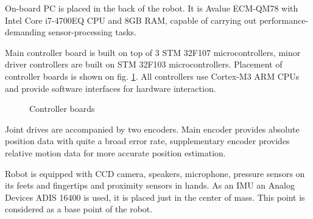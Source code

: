 \documentclass[letterpaper, 10 pt, conference]{ieeeconf}  %
\begin{document}
On-board PC is placed in the back of the robot. It is Avalue ECM-QM78 with Intel
Core i7-4700EQ CPU and 8GB RAM, capable of carrying out performance-demanding
sensor-processing tasks. 

Main controller board is built on top of 3 STM 32F107 microcontrollers, minor
driver controllers are built on STM 32F103 microcontrollers. Placement of
controller boards is shown on fig. \ref{img:electronics}.  All controllers use
Cortex-M3 ARM CPUs and provide software interfaces for hardware interaction.

\begin{figure}[thpb]
\centering
{}
\caption{Controller boards}
\label{img:electronics}
\end{figure}

Joint drives are accompanied by two encoders. Main encoder provides absolute
position data with quite a broad error rate, supplementary encoder provides
relative motion data for more accurate position estimation.
 
Robot is equipped with CCD camera, speakers, microphone, pressure sensors
on its feets and fingertips and proximity sensors in hands. As an IMU an Analog
Devices ADIS 16400 is used, it is placed just in the center of mass. This point is considered as a base point of the robot. 
\end{document}
